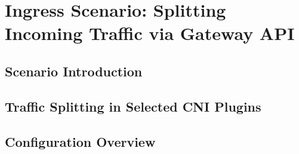 \section{Ingress Scenario: Splitting Incoming Traffic via Gateway API}
\label{sec:ingress}




\subsection{Scenario Introduction}
\label{subsection:ingressScenatioIntro}

\subsection{Traffic Splitting in Selected CNI Plugins}
\label{subsection:trafficSplitting}

\subsection{Configuration Overview}
\label{subsection:ingressConfigOverview}

